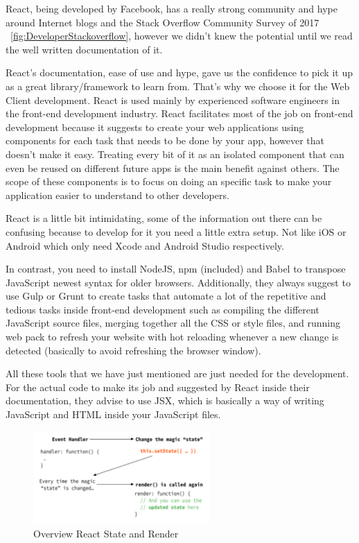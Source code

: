 React, being developed by Facebook, has a really strong community and hype around Internet blogs and the Stack Overflow Community Survey of 2017 ~\ref{fig:DeveloperStackoverflow}, however we didn't knew the potential until we read the well written documentation of it.

React's documentation, ease of use and hype, gave us the confidence to pick it up as a great library/framework to learn from. That's why we choose it for the Web Client development. React is used mainly by experienced software engineers in the front-end development industry. React facilitates most of the job on front-end development because it suggests to create your web applications using components for each task that needs to be done by your app, however that doesn't make it easy. Treating every bit of it as an isolated component that can even be reused on different future apps is the main benefit against others. The scope of these components is to focus on doing an specific task to make your application easier to understand to other developers. 

React is a little bit intimidating, some of the information out there can be confusing because to develop for it you need a little extra setup. Not like iOS or Android which only need Xcode and Android Studio respectively.

In contrast, you need to install NodeJS, npm (included) and Babel to transpose JavaScript newest syntax for older browsers. Additionally, they always suggest to use Gulp or Grunt to create tasks that automate a lot of the repetitive and tedious tasks inside front-end development such as compiling the different JavaScript source files, merging together all the CSS or style files, and running web pack to refresh your website with hot reloading whenever a new change is detected (basically to avoid refreshing the browser window).

All these tools that we have just mentioned are just needed for the development. For the actual code to make its job and suggested by React inside their documentation, they advise to use JSX, which is basically a way of writing JavaScript and HTML inside your JavaScript files.


\begin{figure}[ht]
\centering
\includegraphics[width=0.6\textwidth]{figs/reactstyle}
	\caption{Overview React State and Render}
	\label{fig:reactstyle}
\end{figure}

